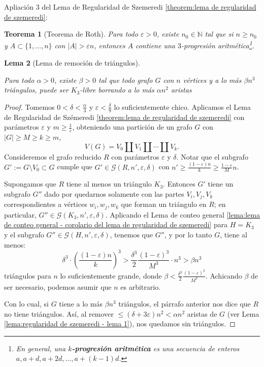 \documentclass[12pt]{report}
\theoremstyle{plain}
\newtheorem{theorem}{Teorema}[section]
\newtheorem{lemma}[theorem]{Lema}
\theoremstyle{definition}
\newcommand{\naturals}{\mathbb{N}}
\newcommand{\abs}[1]{\left \vert #1 \right \vert}
\begin{document}
Apliación $3$ del Lema de Regularidad de Szemeredi \ref{theorem:lema de regularidad de szemeredi}:

\begin{theorem}[Teorema de Roth]\label{th:teorema de Roth}
Para todo $\varepsilon > 0$, existe $n_0 \in \naturals$ tal que si $n \geq n_0$ y $A \subset \{1 , \ldots, n\}$ con $\abs A > \varepsilon n$, entonces $A$ contiene una \textit{$3$-progresión aritmética}\footnote{En general, una \textbf{$k$-progresión aritmética} es una secuencia de enteros $a, a+d, a + 2d , \ldots, a + (k-1)d$.}.
\end{theorem}

\begin{lemma}[Lema de remoción de triángulos]\label{lema:lema de remocion de triangulos}

Para todo $\alpha > 0$, existe $\beta > 0$ tal que todo grafo $G$ con $n$ vértices y a lo más $\beta n^3$ triángulos, puede ser $K_3$-libre borrando a lo más $\alpha n^2$ aristas
\end{lemma}
\begin{proof}
Tomemos $0 < \delta < \frac{ \alpha}{3}$ y $\varepsilon < \frac{\delta}{9}$ lo suficientemente chico. Aplicamos el Lema de Regularidad de Szémeredi \ref{theorem:lema de regularidad de szemeredi} con parámetros $\varepsilon$ y $m \geq \frac 1 \varepsilon$, obteniendo una partición de un grafo $G$ con $\abs G \geq M \geq k \geq m$,
\[
    V(G) = V_0 \coprod V_1 \coprod \cdots \coprod V_k.
\]
Consideremos el grafo reducido $R$ con parámetros $\varepsilon$ y $\delta$. Notar que el subgrafo $G' := G \setminus V_0 \subset G$ cumple que $G' \in \mathcal G (R, n', \varepsilon, \delta)$ con $n' \geq \frac{(1- \varepsilon)n}{k} \geq \frac{1-\varepsilon}{M}n$.

Supongamos que $R$ tiene al menos un triángulo $K_3$. Entonces $G'$ tiene un subgrafo $G''$ dado por quedarnos solamente con las partes $V_i, V_j, V_k$ correspondientes a vértices $w_i,w_j,w_k$ que forman un triángulo en $R$; en particular, $G'' \in \mathcal G (K_3, n', \varepsilon, \delta)$. Aplicando el Lema de conteo general \ref{lema:lema de conteo general - corolario del lema de regularidad de szemeredi} para $H = K_3$ y el subgrafo $G'' \in \mathcal G (H, n' , \varepsilon, \delta)$, tenemos que $G''$, y por lo tanto $G$, tiene al menos:
\[
    \delta^3 \cdot \left ( \frac{(1 - \varepsilon)n}{k} \right )^3 > \frac{\delta^3}{2} \frac{(1- \varepsilon)^3}{M^3} \cdot n^3 > \beta n^3
\]
triángulos para $n$ lo suficientemente grande, donde $\beta < \frac{\delta^3}{2} \frac{(1- \varepsilon)^3}{M^3}$. Achicando $\beta$ de ser necesario, podemos asumir que $n$ es arbitrario.

Con lo cual, si $G$ tiene a lo más $\beta n^3$ triángulos, el párrafo anterior nos dice que $R$ no tiene triángulos. Así, al remover $\leq (\delta + 3 \varepsilon)n^2 < \alpha n^2$ aristas de $G$ (ver Lema \ref{lema:regularidad de szemeredi - lema 1}), nos quedamos sin triángulos.
\end{proof}
\end{document}
